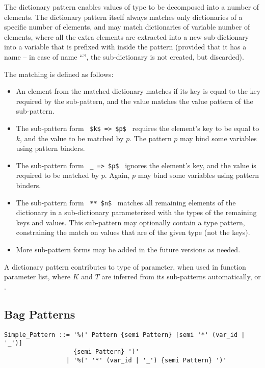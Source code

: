 The dictionary pattern enables values of  type to be decomposed into a number of elements. The dictionary pattern itself always matches only dictionaries of a specific number of elements, and may match dictionaries of variable number of elements, where all the extra elements are extracted into a new sub-dictionary into a variable that is prefixed with \code{**} inside the pattern (provided that it has a name -- in case of name ``\code{_}'', the sub-dictionary is not created, but discarded). 

The matching is defined as follows: 
\begin{itemize}
  \item An element from the matched dictionary matches if its key is equal to the key required by the sub-pattern, and the value matches the value pattern of the sub-pattern. 
  \item The sub-pattern form ~\lstinline!$k$ => $p$!~ requires the element's key to be equal to $k$, and the value to be matched by $p$. The pattern $p$ may bind some variables using pattern binders. 
  \item The sub-pattern form ~\lstinline!_ => $p$!~ ignores the element's key, and the value is required to be matched by $p$. Again, $p$ may bind some variables using pattern binders. 
  \item The sub-pattern form ~\lstinline!** $n$!~ matches all remaining elements of the dictionary in a sub-dictionary parameterized with the types of the remaining keys and values. This sub-pattern may optionally contain a type pattern, constraining the match on values that are of the given type (not the keys). 
  \item More sub-pattern forms may be added in the future versions as needed. %
\end{itemize}

A dictionary pattern contributes  to type of parameter, when used in function parameter list, where $K$ and $T$ are inferred from its sub-patterns automatically, or . 





\subsection{Bag Patterns}
\label{sec:bag-patterns}

\syntax\begin{lstlisting}
Simple_Pattern ::= '%(' Pattern {semi Pattern} [semi '*' (var_id | '_')] 
                   {semi Pattern} ')'
                 | '%(' '*' (var_id | '_') {semi Pattern} ')'
\end{lstlisting}

